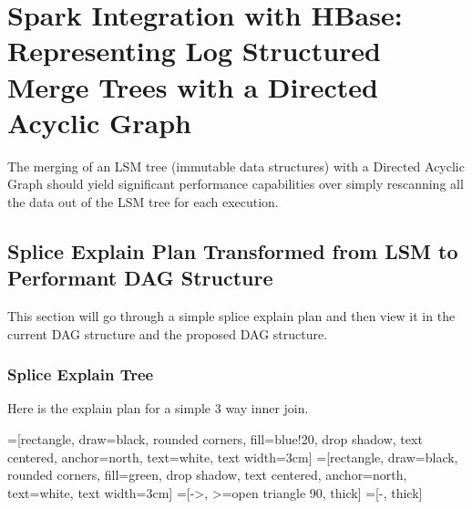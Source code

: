 \section{Spark Integration with HBase: Representing Log Structured Merge Trees
with a Directed Acyclic Graph}
The merging of an LSM tree (immutable data structures) with a Directed Acyclic
Graph should yield significant performance capabilities over simply rescanning
all the data out of the LSM tree for each execution.  

\subsection{Splice Explain Plan Transformed from LSM to Performant DAG
Structure} This section will go through a simple splice explain plan and then
view it in the current DAG structure and the proposed DAG structure.

\subsubsection{Splice Explain Tree}
Here is the explain plan for a simple 3 way inner join.

=[rectangle, draw=black, rounded corners, fill=blue!20, drop shadow, text centered, anchor=north, text=white, text width=3cm]
=[rectangle, draw=black, rounded corners, fill=green, drop shadow,
        text centered, anchor=north, text=white, text width=3cm]
=[->, >=open triangle 90, thick]
=[-, thick]
        
\begin{center}
\end{center}

